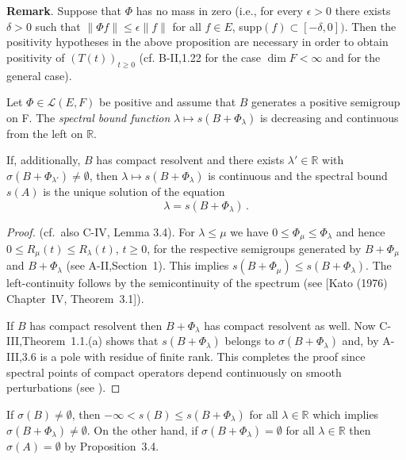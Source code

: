 \noindent
\textbf{Remark}. Suppose that $\Phi$ has no mass in zero (i.e., for every $\epsilon > 0$ there exists $\delta > 0$ such that $\|\Phi f\| \leq \epsilon \|f\|$ for all $f \in E$, supp$(f) \subset [-\delta,0])$. Then the positivity hypotheses in the above proposition are necessary in order to obtain positivity of $(T(t))_{t \geq 0}$ (cf. B-II,1.22 for the case $\dim F < \infty$ and \citet{kerscher:1986} for the general case).
\begin{proposition}\label{prop:b4-3.6}
	Let $\Phi \in \mathcal{L}(E,F)$ be positive and assume that $B$ generates a positive semigroup on F. The \emph{spectral bound function} $\lambda \mapsto s(B + \Phi_\lambda)$ is decreasing and continuous from the left on $\mathbb{R}$.
	
	If, additionally, $B$ has compact resolvent and there exists $\lambda' \in \mathbb{R}$ with $\sigma(B + \Phi_{\lambda'}) \neq \emptyset$, then $\lambda \mapsto s(B + \Phi_\lambda)$ is continuous and the spectral bound $s(A)$ is the unique solution of the equation
	\begin{equation}\label{eq:b4-3.5}
		\lambda = s(B + \Phi_\lambda)\,.
	\end{equation}
\end{proposition}

\begin{proof} (cf.\ also C-IV, Lemma 3.4). For $\lambda \leq \mu$ we have $0 \leq \Phi_\mu \leq \Phi_\lambda$ and hence $0 \leq R_\mu(t) \leq R_\lambda(t)$, $t \geq 0$, for the respective semigroups generated by $B + \Phi_\mu$ and $B + \Phi_\lambda$ (see A-II,Section~1). This implies $s(B + \Phi_\mu) \leq s(B + \Phi_\lambda)$. The left-continuity follows by the semicontinuity of the spectrum (see [Kato (1976) Chapter~IV, Theorem~3.1]).

If $B$ has compact resolvent then $B + \Phi_\lambda$ has compact resolvent as well. 
Now C-III,Theorem~1.1.(a) shows that $s(B + \Phi_\lambda)$ belongs to $\sigma(B + \Phi_\lambda)$ and, by A-III,3.6 is a pole with residue of finite rank. This completes the proof since spectral points of compact operators depend continuously on smooth perturbations (see \citet[VII,6.Theorem~9]{dunfordschwartz:1958}).
\end{proof}

If $\sigma(B) \neq \emptyset$, then $-\infty < s(B) \leq s(B + \Phi_\lambda)$ for all $\lambda \in \mathbb{R}$ which implies $\sigma(B + \Phi_\lambda) \neq \emptyset$. On the other hand, if $\sigma(B + \Phi_\lambda) = \emptyset$ for all $\lambda \in \mathbb{R}$ then $\sigma(A) = \emptyset$ by Proposition~3.4.

